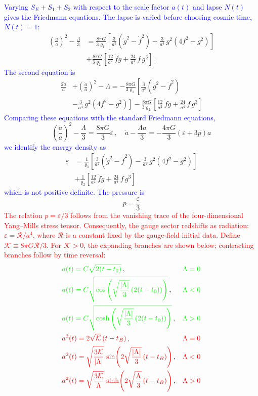 \documentclass [prd,reprint,eqsecnum,nofootinbib]  {revtex4-1}
\newcommand{\lang}[1]{\textcolor{blue}{#1}}
\newcommand{\science}[1]{\textcolor{red}{#1}}
\newcommand{\remove}[1]{\textcolor{green}{#1}}
\begin{document}
\lang{Varying $S_E+S_1+S_2$ with respect to the scale factor $a(t)$
and lapse $N(t)$ gives the Friedmann equations. The lapse is varied
before choosing cosmic time, $N(t)=1$:}
\begin{align}
\left(\frac{\dot{a}}{a} \right)^2-\frac{\Lambda}{3}
 &=\frac{8\pi G}{3\varrho_1}\left[\frac{3}{a^2} \left(\dot g^2 - \dot
 f^2\right)
 -\frac{3}{a^4}\,g^2\left(4f^2-g^2\right)\right]\nonumber\\
 &+\frac{8\pi G}{3\varrho_2}\left[\frac{12}{a^2}\, \dot f \dot g +\frac{24}{a^4}\,f\, g^3\right]\,.\label{25}
\end{align}
\lang{The second equation is}
\begin{align}
\frac{2\ddot a}{a} &+ \left(\frac{\dot a}{a}\right)^2 - \Lambda
 =-\frac{8\pi G}{3\varrho_1}\left[\frac{3}{a^2} \left(\dot g^2 - \dot
 f^2\right)\right.\nonumber\\
 &-\left.\frac{3}{a^4}\,g^2\left(4f^2-g^2\right)\right]
 -\frac{8\pi G}{3\varrho_2}\left[\frac{12}{a^2}\, \dot f \dot g +\frac{24}{a^4}\,f\, g^3\right]\label{26}
\end{align}
\lang{Comparing these equations with the standard Friedmann
equations,}
$$
\left(\frac{\dot{a}}{a} \right)^2-\frac\Lambda3=\frac{8\pi
G}{3}\varepsilon\, , \quad \ddot a -\frac{\Lambda a}3=-\frac{4\pi
G}{3}(\varepsilon+3p)a
$$
\lang{we identify the energy density as}
\begin{align}
    \varepsilon&= \frac{1}{\varrho_1}\left[\frac{3}{a^2} \left(\dot g^2 - \dot
 f^2\right)
 -\frac{3}{a^4}\,g^2\left(4f^2-g^2\right)\right]\nonumber\\
 &+\frac{1}{\varrho_2}\left[\frac{12}{a^2}\, \dot f \dot g +\frac{24}{a^4}\,f\, g^3\right]\label{27}
\end{align}
\lang{which is not positive definite. The pressure is}
\begin{equation}\label{28}
    p=\frac\varepsilon3
\end{equation}
 \science{The relation $p=\varepsilon/3$ follows from the vanishing
trace of the four-dimensional Yang--Mills stress tensor. Consequently,
the gauge sector redshifts as radiation: $\varepsilon=\mathcal R/a^4$,
where $\mathcal R$ is a constant fixed by the gauge-field initial
data. Define $\mathcal K\equiv 8\pi G\mathcal R/3$. For
$\mathcal K>0$, the expanding branches are shown below; contracting
branches follow by time reversal:}
\begin{align*}
 &\remove{a(t)= C \sqrt{2 (t-t_0)}}\,, &\remove{\Lambda=0}\\
 &\remove{a(t)= C \sqrt{\cos \left(\sqrt{\frac{|\Lambda|}{3} } \left(2 (t-t_0)\right)\right)}}\,, &\remove{\Lambda<0}\\
 &\remove{a(t)= C \sqrt{\cosh \left(\sqrt{\frac{|\Lambda|}{3} } \left(2 (t-t_0)\right)\right)}}\,, &\remove{\Lambda>0}\\
 &\science{a^2(t)=2\sqrt{\mathcal K}\,(t-t_B)}\,, &\science{\Lambda=0}\\
 &\science{a^2(t)=\sqrt{\frac{3\mathcal K}{|\Lambda|}}\,
\sin\!\left(2\sqrt{\frac{|\Lambda|}{3}}\,(t-t_B)\right)}\,, &\science{\Lambda<0}\\
 &\science{a^2(t)=\sqrt{\frac{3\mathcal K}{\Lambda}}\,
\sinh\!\left(2\sqrt{\frac{\Lambda}{3}}\,(t-t_B)\right)}\,, &\science{\Lambda>0}
\end{align*}
\end{document}
